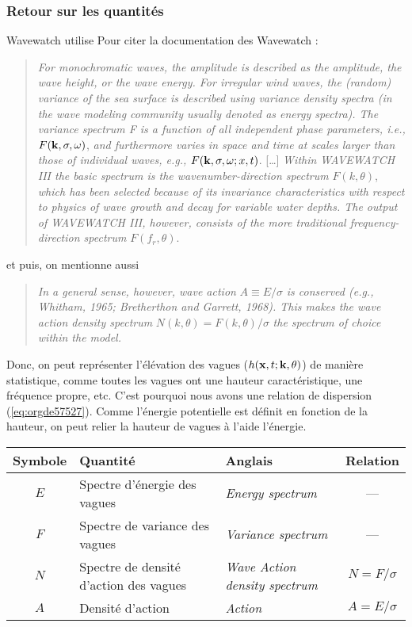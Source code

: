 \documentclass[10pt]{article}
\numberwithin{equation}{section}
\begin{document}
\subsubsection{Retour sur les quantités}
\label{sec:org1a303b5}
Wavewatch utilise Pour citer la documentation des Wavewatch \autocite{wwiii2016user} :\medskip
\begin{quote}
\emph{For monochromatic waves, the amplitude is described as the amplitude, the wave height, or the wave energy. For irregular wind waves, the (random) variance of the sea surface is described using variance density spectra (in the wave modeling community usually denoted as energy spectra). The variance spectrum F is a function of all independent phase parameters, i.e.,} \(F(\vb{k},\sigma,\omega)\), \emph{and furthermore varies in space and time at scales larger than those of individual waves, e.g.,} \(F(\vb{k},\sigma,\omega; x, t)\). [\ldots{}]
\emph{Within WAVEWATCH III the basic spectrum is the wavenumber-direction spectrum} \(F(k,\theta)\), \emph{which has been selected because of its invariance characteristics with respect to physics of wave growth and decay for variable water depths. The output of WAVEWATCH III, however, consists of the more traditional frequency-direction spectrum} \(F(f_r,\theta)\).
\end{quote}
\medskip

et puis, on mentionne aussi \medskip
\begin{quote}
\emph{In a general sense, however, wave action} \(A\equiv E/\sigma\) \emph{is conserved (e.g., Whitham, 1965; Bretherthon and Garrett, 1968). This makes the wave action density spectrum} \(N(k,\theta) = F(k,\theta)/\sigma\) \emph{the spectrum of choice within the model.}
\end{quote}
\medskip

Donc, on peut représenter l'élévation des vagues (\(h(\vb{x},t;\vb{k},\theta)\)) de manière statistique, comme toutes les vagues ont une hauteur caractéristique, une fréquence propre, etc.
C'est pourquoi nous avons une relation de dispersion (\ref{eq:orgde57527}).
Comme l'énergie potentielle est définit en fonction de la hauteur, on peut relier la hauteur de vagues à l'aide l'énergie.

\begin{center}
\begin{tabular}{cllc}
\hline
Symbole & Quantité & Anglais & Relation\\
\hline
\(E\) & Spectre d'énergie des vagues & \emph{Energy spectrum} & ---\\
\(F\) & Spectre de variance des vagues & \emph{Variance spectrum} & ---\\
\(N\) & Spectre de densité d'action des vagues & \emph{Wave Action density spectrum} & \(N = F/\sigma\)\\
\(A\) & Densité d'action & \emph{Action} & \(A = E/\sigma\)\\
\hline
\end{tabular}
\end{center}
\end{document}

